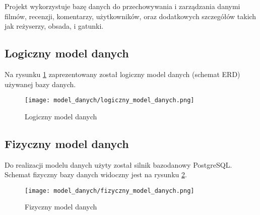 \documentclass[../main.tex]{subfiles}
\begin{document}
Projekt wykorzystuje bazę danych do przechowywania i zarządzania danymi filmów, recenzji, komentarzy, użytkowników, oraz dodatkowych szczegółów takich jak reżyserzy, obsada, i gatunki.

\subsection{Logiczny model danych}
Na rysunku \ref{fig:model_danych:logiczny} zaprezentowany został logiczny model danych (schemat ERD) używanej bazy danych.
\begin{figure}[htb]
	\centering
	\texttt{[image: model\_danych/logiczny\_model\_danych.png]}
	\caption{Logiczny model danych}
	\label{fig:model_danych:logiczny}
\end{figure}

\subsection{Fizyczny model danych}
Do realizacji modelu danych użyty został silnik bazodanowy PostgreSQL. Schemat fizyczny bazy danych widoczny jest na rysunku \ref{fig:model_danych:fizyczny}.

\begin{figure}[htb]
	\centering
	\texttt{[image: model\_danych/fizyczny\_model\_danych.png]}
	\caption{Fizyczny model danych}
	\label{fig:model_danych:fizyczny}
\end{figure}
\end{document}
